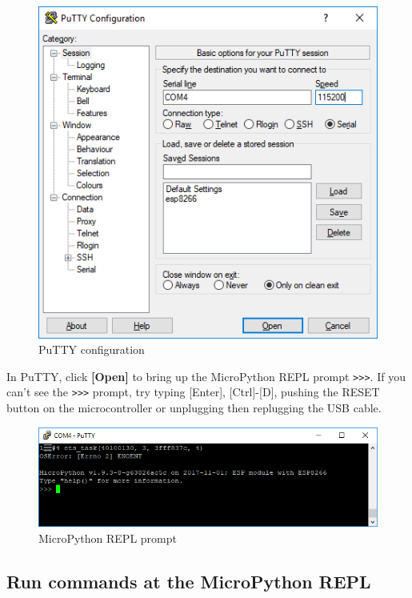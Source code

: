 \documentclass{book}
\makeatletter
\def\maxwidth{\ifdim\Gin@nat@width>\linewidth\linewidth
    \else\Gin@nat@width\fi}
\let\Oldincludegraphics\includegraphics
\renewcommand{\includegraphics}[1]{\Oldincludegraphics[width=.8\maxwidth]{#1}}
\makeatother
\begin{document}
\begin{figure}
\centering
\includegraphics{images/putty_config.PNG}
\caption{PuTTY configuration}
\end{figure}

In PuTTY, click \textbf{{[}Open{]}} to bring up the MicroPython REPL
prompt \lstinline!>>>!. If you can't see the \lstinline!>>>! prompt, try
typing {[}Enter{]}, {[}Ctrl{]}-{[}D{]}, pushing the RESET button on the
microcontroller or unplugging then replugging the USB cable.

\begin{figure}
\centering
\includegraphics{images/REPL_prompt.PNG}
\caption{MicroPython REPL prompt}
\end{figure}
    




    
        \subsection{Run commands at the MicroPython
REPL}\label{run-commands-at-the-micropython-repl}
    
\end{document}
